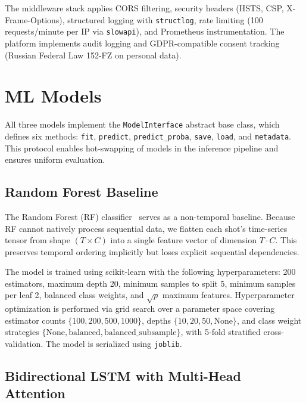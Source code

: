 \documentclass[twocolumn]{article}
\begin{document}
The middleware stack applies CORS filtering, security headers
(HSTS, CSP, X-Frame-Options), structured logging with
\texttt{structlog}, rate limiting (100 requests/minute per IP
via \texttt{slowapi}), and Prometheus instrumentation.
The platform implements audit logging and GDPR-compatible
consent tracking (Russian Federal Law 152-FZ on personal data).


\section{ML Models}
\label{sec:models}

All three models implement the \texttt{ModelInterface} abstract
base class, which defines six methods:
\texttt{fit}, \texttt{predict}, \texttt{predict\_proba},
\texttt{save}, \texttt{load}, and \texttt{metadata}.
This protocol enables hot-swapping of models in the inference
pipeline and ensures uniform evaluation.

\subsection{Random Forest Baseline}
\label{sec:rf}

The Random Forest (RF) classifier~\citep{breiman2001} serves
as a non-temporal baseline.
Because RF cannot natively process sequential data, we flatten
each shot's time-series tensor from shape
$(T \times C)$ into a single feature vector of dimension
$T \cdot C$.
This preserves temporal ordering implicitly but loses explicit
sequential dependencies.

The model is trained using scikit-learn with the following
hyperparameters: 200 estimators, maximum depth 20,
minimum samples to split 5, minimum samples per leaf 2,
balanced class weights, and $\sqrt{p}$ maximum features.
Hyperparameter optimization is performed via grid search over
a parameter space covering estimator counts
$\{100, 200, 500, 1000\}$, depths
$\{10, 20, 50, \text{None}\}$, and class weight strategies
$\{\text{None}, \text{balanced}, \text{balanced\_subsample}\}$,
with 5-fold stratified cross-validation.
The model is serialized using \texttt{joblib}.

\subsection{Bidirectional LSTM with Multi-Head Attention}
\label{sec:lstm}
\end{document}
